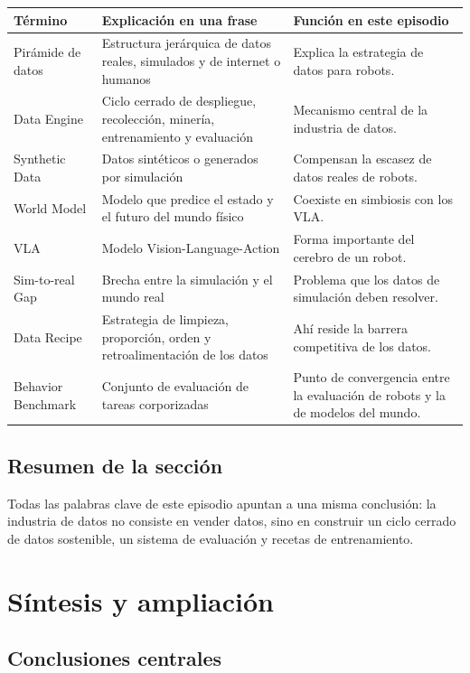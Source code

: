 \documentclass[a4paper]{article}
\begin{document}
\begin{longtable}{p{}p{}p{}}
\toprule
Término & Explicación en una frase & Función en este episodio \\
\midrule
Pirámide de datos & Estructura jerárquica de datos reales, simulados y de internet o humanos & Explica la estrategia de datos para robots. \\
Data Engine & Ciclo cerrado de despliegue, recolección, minería, entrenamiento y evaluación & Mecanismo central de la industria de datos. \\
Synthetic Data & Datos sintéticos o generados por simulación & Compensan la escasez de datos reales de robots. \\
World Model & Modelo que predice el estado y el futuro del mundo físico & Coexiste en simbiosis con los VLA. \\
VLA & Modelo Vision-Language-Action & Forma importante del cerebro de un robot. \\
Sim-to-real Gap & Brecha entre la simulación y el mundo real & Problema que los datos de simulación deben resolver. \\
Data Recipe & Estrategia de limpieza, proporción, orden y retroalimentación de los datos & Ahí reside la barrera competitiva de los datos. \\
Behavior Benchmark & Conjunto de evaluación de tareas corporizadas & Punto de convergencia entre la evaluación de robots y la de modelos del mundo. \\
\bottomrule
\end{longtable}

\subsection{Resumen de la sección}

Todas las palabras clave de este episodio apuntan a una misma conclusión: la industria de datos no consiste en vender datos, sino en construir un ciclo cerrado de datos sostenible, un sistema de evaluación y recetas de entrenamiento.

\section{Síntesis y ampliación}

\subsection{Conclusiones centrales}
\end{document}
